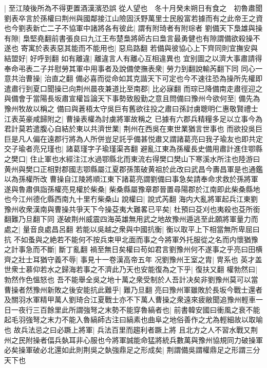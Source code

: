 |{
	至江陵後所為不得更置酒漢濱恐誤}
從人望也　冬十月癸未朔日有食之　初魯肅聞劉表卒言於孫權曰荆州與國鄰接江山險固沃野萬里士民殷富若據而有之此帝王之資也今劉表新亡二子不協軍中諸將各有彼此|{
	謂有附琦者有附琮者}
劉備天下梟雄與操有隙|{
	梟堅堯翻前書張良曰九江王布楚梟將師古曰梟言最勇健也有隙謂備欲殺操不遂也}
寄寓於表表惡其能而不能用也|{
	惡烏路翻}
若備與彼協心上下齊同則宜撫安與結盟好|{
	好呼到翻}
如有離違|{
	離違言人有離心互相違異也}
宜别圖之以濟大事肅請得奉命弔表二子并慰勞其軍中用事者及說備使撫表衆|{
	勞力到翻說輸芮翻下同}
同心一意共治曹操|{
	治直之翻}
備必喜而從命如其克諧天下可定也今不速往恐為操所先權即遣肅行到夏口聞操已向荆州晨夜兼道比至南郡|{
	比必寐翻}
而琮已降備南走肅徑迎之與備會于當陽長坂肅宣權旨論天下事勢致殷勤之意且問備曰豫州今欲何至|{
	備先為豫州牧故以稱之}
備曰與蒼梧太守吳巨有舊欲往投之肅曰孫討虜聰明仁惠敬賢禮士江表英豪咸歸附之|{
	曹操表權為討虜將軍故稱之}
已據有六郡兵精糧多足以立事今為君計莫若遣腹心自結於東以共濟世業|{
	荆州在西吳在東世業猶言世事也}
而欲投吳巨巨是凡人偏在遠郡行將為人所併豈足託乎備甚悦肅又謂諸葛亮曰我子瑜友也即共定交子瑜者亮兄瑾也|{
	諸葛瑾字子瑜瑾渠吝翻}
避亂江東為孫權長史備用肅計進住鄂縣之樊口|{
	住止軍也水經注江水過鄂縣北而東流右得樊口樊山下寒溪水所注也陸游曰黄州與樊口正相對郡國志鄂縣屬江夏郡孫策破黄祖於此改曰武昌今夀昌軍是也通鑑以為孫權所改}
曹操自江陵將順江東下諸葛亮謂劉備曰事急矣請奉命求救於孫將軍遂與魯肅俱詣孫權亮見權於柴桑|{
	柴桑縣屬豫章郡晉置尋陽郡於江南即此柴桑縣地也今江州德化縣西南九十里冇柴桑山}
說權曰|{
	說式芮翻}
海内大亂將軍起兵江東劉豫州收衆漢南與曹操共爭天下今操芟夷大難畧已平矣|{
	杜預曰芟刈也夷殺也芟所銜翻難乃旦翻下同}
遂破荆州威震四海英雄無用武之地故豫州遁逃至此願將軍量力而處之|{
	量音良處昌呂翻}
若能以吳越之衆與中國抗衡|{
	衡以取平上下相當無所卑屈曰抗}
不如蚤與之絶若不能何不按兵束甲北面而事之今將軍外托服從之名而内懷猶豫之計事急而不斷|{
	斷丁亂翻}
禍至無日矣權曰苟如君言劉豫州何不遂事之乎亮曰田横齊之壯士耳猶守義不辱|{
	事見十一卷漢高帝五年}
况劉豫州王室之胄|{
	冑系也}
英才盖世衆士慕仰若水之歸海若事之不濟此乃天也安能復為之下乎|{
	復扶又翻}
權勃然曰|{
	勃然作色慍怒也}
吾不能舉全吳之地十萬之衆受制於人吾計决矣非劉豫州莫可以當曹操者然豫州新敗之後安能抗此難乎|{
	難乃旦翻}
亮曰豫州軍雖敗於長坂今戰士還者及關羽水軍精甲萬人劉琦合江夏戰士亦不下萬人曹操之衆遠來疲敝聞追豫州輕車一日一夜行三百餘里此所謂強弩之末勢不能穿魯縞者也|{
	前書韓安國曰衝風之衰不能起毛羽強弩之末力不能入魯縞師古注曰縞素也曲阜之地俗善作之尤為輕細故以取喻也}
故兵法忌之曰必蹶上將軍|{
	兵法百里而趨利者蹶上將}
且北方之人不習水戰又荆州之民附操者偪兵埶耳非心服也今將軍誠能命猛將統兵數萬與豫州協規同力破操軍必矣操軍破必北還如此則荆吳之埶強鼎足之形成矣|{
	荆謂備吳謂權鼎足之形謂三分天下也}
